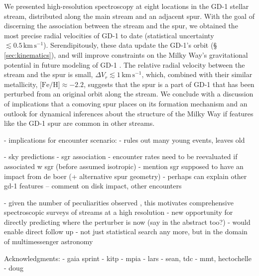\documentclass[twocolumn]{aastex63}
\newcommand{\kms}{\ensuremath{\textrm{km}\,\textrm{s}^{-1}}}
\newcommand{\feh}{\ensuremath{\textrm{[Fe/H]}}}
\begin{document}
We presented high-resolution spectroscopy at eight locations in the GD-1 stellar stream, distributed along the main stream and an adjacent spur.
With the goal of discerning the association between the stream and the spur, we obtained the most precise radial velocities of GD-1 to date (statistical uncertainty $\lesssim0.5\,\kms$).
Serendipitously, these data update the GD-1's orbit (\S\,\ref{sec:kinematics}), and will improve constraints on the Milky Way's gravitational potential in future modeling of GD-1 \citep[similar to, e.g.,][]{koposov2010, bowden2015, bovy2016}.
The relative radial velocity between the stream and the spur is small, $\Delta V_r\lesssim1\,\kms$, which, combined with their similar metallicity, $\feh\approx-2.2$, suggests that the spur is a part of GD-1 that has been perturbed from an original orbit along the stream.
We conclude with a discussion of implications that a comoving spur places on its formation mechanism and an outlook for dynamical inferences about the structure of the Milky Way if features like the GD-1 spur are common in other streams.



- implications for encounter scenario:
- rules out many young events, leaves old

- sky predictions
- sgr association
- encounter rates need to be reevaluated if associated w sgr (before assumed isotropic)
- mention sgr supposed to have an impact from de boer (+ alternative spur geometry)
- perhaps can explain other gd-1 features
-- comment on disk impact, other encounters

- given the number of peculiarities observed \citep{pwb, jhelum, pal5}, this motivates comprehensive spectroscopic surveys of streams at a high resolution
- new opportunity for directly predicting where the perturber is now (say in the abstract too?)
- would enable direct follow up
- not just statistical search any more, but in the domain of multimessenger astronomy


Acknowledgments: 
- gaia sprint
- kitp
- mpia
- lars
- sean, tdc
- mmt, hectochelle
- doug



\end{document}
